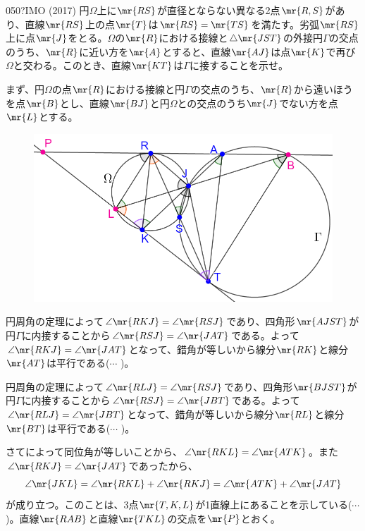 \begin{thm}{050}{\hosi ?}{IMO (2017)}
 円$\Omega$上に$\mr{RS}$が直径とならない異なる2点$\mr{R, S}$があり、直線$\mr{RS}$上の点$\mr{T}$は$\mr{RS}=\mr{TS}$を満たす。劣弧$\mr{RS}$上に点$\mr{J}$をとる。$\Omega$の$\mr{R}$における接線と$\triangle\mr{JST}$の外接円$\Gamma$の交点のうち、$\mr{R}$に近い方を$\mr{A}$とすると、直線$\mr{AJ}$は点$\mr{K}$で再び$\Omega$と交わる。このとき、直線$\mr{KT}$は$\Gamma$に接することを示せ。
\end{thm}

まず、円$\Omega$の点$\mr{R}$における接線と円$\Gamma$の交点のうち、$\mr{R}$から遠いほうを点$\mr{B}$とし、直線$\mr{BJ}$と円$\Omega$との交点のうち$\mr{J}$でない方を点$\mr{L}$とする。

\begin{figure}[H]
 \centering
 \includegraphics[width=0.8\linewidth]{../problems/Q_050/A_050.png}
\end{figure}

円周角の定理によって$\angle\mr{RKJ}=\angle\mr{RSJ}$であり、四角形$\mr{AJST}$が円$\Gamma$に内接することから$\angle\mr{RSJ}=\angle\mr{JAT}$である。よって$\angle\mr{RKJ}=\angle\mr{JAT}$となって、錯角が等しいから線分$\mr{RK}$と線分$\mr{AT}$は平行である($\cdots$ )。

円周角の定理によって$\angle\mr{RLJ}=\angle\mr{RSJ}$であり、四角形$\mr{BJST}$が円$\Gamma$に内接することから$\angle\mr{RSJ}=\angle\mr{JBT}$である。よって$\angle\mr{RLJ}=\angle\mr{JBT}$となって、錯角が等しいから線分$\mr{RL}$と線分$\mr{BT}$は平行である($\cdots$ )。

さてによって同位角が等しいことから、$\angle\mr{RKL}=\angle\mr{ATK}$。また$\angle\mr{RKJ}=\angle\mr{JAT}$であったから、
\[ \angle\mr{JKL}=\angle\mr{RKL}+\angle\mr{RKJ}=\angle\mr{ATK}+\angle\mr{JAT} \]
が成り立つ。このことは、3点$\mr{T, K, L}$が1直線上にあることを示している($\cdots$ )。直線$\mr{RAB}$と直線$\mr{TKL}$の交点を$\mr{P}$とおく。

